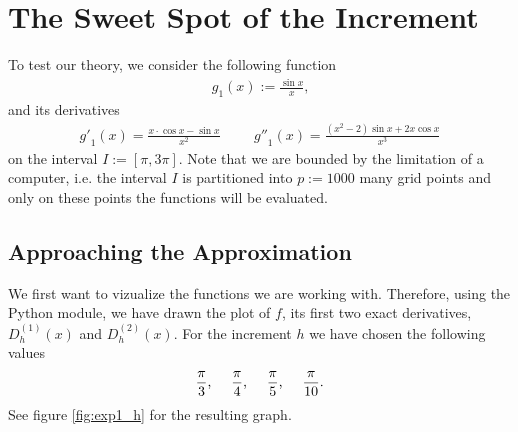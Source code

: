 \section{The Sweet Spot of the Increment}
To test our theory, we consider the following function
\begin{align*}
    g_1(x) := \frac{\sin{x}}{x} \text{,}
\end{align*}
and its derivatives
\begin{align*}
    {g'}_{1}(x) = \frac{x \cdot \cos{x} - \sin{x}}{x^2} \hspace{1cm} {g''}_{1}(x) = \frac{(x^2 - 2) \sin{x} + 2 x \cos{x}}{x^3} \text{}
\end{align*}
on the interval \(I := [\pi, 3\pi]\). Note that we are bounded by the limitation of a computer, i.e. the interval \(I\) is partitioned into \(p := 1000\) many grid points and only on these points the functions will be evaluated.


\subsection{Approaching the Approximation} %

We first want to vizualize the functions we are working with. Therefore, using the Python module, we have drawn the plot of \(f\), its first two exact derivatives, \(D^{(1)}_h(x)\) and \(D^{(2)}_h(x)\). For the increment \(h\) we have chosen the following values
\begin{align*}
    \frac{\pi}{3} \text{,} \hspace{0.5cm} \frac{\pi}{4} \text{,} \hspace{0.5cm} \frac{\pi}{5} \text{,} \hspace{0.5cm} \frac{\pi}{10} \text{.}
\end{align*}
See figure \ref{fig:exp1_h} for the resulting graph.

